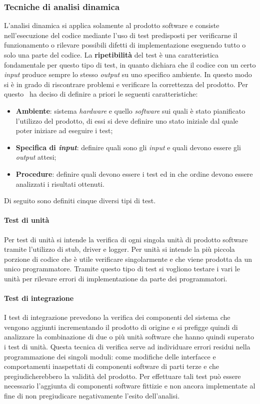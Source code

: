 \subsubsection{Tecniche di analisi dinamica}
L'analisi dinamica si applica solamente al prodotto software e consiste nell'esecuzione del codice mediante l'uso di test predisposti per verificarne il funzionamento o rilevare possibili difetti di implementazione eseguendo tutto o solo una parte del codice.
La \textbf{ripetibilità} del test è una caratteristica fondamentale per questo tipo di test, in quanto dichiara che il codice con un certo \textit{input} produce sempre lo stesso \textit{output} su uno specifico ambiente. In questo modo si è in grado di riscontrare problemi e verificare la correttezza del prodotto.
Per questo \gruppo ~ha deciso di definire a priori le seguenti caratteristiche:
\begin{itemize}
\item \textbf{Ambiente}: sistema \textit{hardware} e quello \textit{software} sui quali è stato pianificato l'utilizzo del prodotto, di essi si deve definire uno stato iniziale dal quale poter iniziare ad eseguire i test;
\item \textbf{Specifica di \textit{input}}: definire quali sono gli \textit{input} e quali devono essere gli \textit{output} attesi;
\item \textbf{Procedure}: definire quali devono essere i test ed in che ordine devono essere analizzati i risultati ottenuti.
\end{itemize}
Di seguito sono definiti cinque diversi tipi di test.
\paragraph{Test di unità} 
Per test di unità si intende la verifica di ogni singola unità di prodotto software tramite l'utilizzo di stub, driver e logger. Per unità si intende la più piccola porzione di codice che è utile verificare singolarmente e che viene prodotta da un unico programmatore. Tramite questo tipo di test si vogliono testare i vari le unità per rilevare errori di implementazione da parte dei programmatori.
\paragraph{Test di integrazione}
I test di integrazione prevedono la verifica dei componenti del sistema che vengono aggiunti incrementando il prodotto di origine e si prefigge quindi di analizzare la combinazione di due o più unità software che hanno quindi superato i test di unità. Questa tecnica di verifica serve ad individuare errori residui nella programmazione dei singoli moduli: come modifiche delle interfacce e comportamenti inaspettati di componenti software di parti terze e che pregiudicherebbero la validità del prodotto. Per effettuare tali test può essere necessario l'aggiunta di componenti software fittizie e non ancora implementate al fine di non pregiudicare negativamente l'esito dell'analisi.
